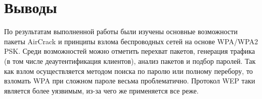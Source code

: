 \documentclass[10pt,a4paper]{article}
\begin{document}
\section{Выводы}
По результатам выполненной работы были изучены основные возможности пакеты AirCrack и принципы взлома беспроводных сетей на основе WPA/WPA2 PSK. Среди возможностей можно отметить перехват пакетов, генерация трафика (в том числе деаутентификация клиентов), анализ пакетов и подбор паролей. Так как взлом осуществляется методом поиска по паролю или полному перебору, то взломать WPA при сложном пароле весьма проблематично. Протокол WEP таки является более уязвимым, из-за чего же применяется все реже.
\end{document}

